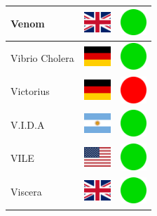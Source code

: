 \documentclass[12pt, a4paper, twoside]{report}
\begin{document}
\begin{center}
\begin{longtable}{|p{5cm}|p{2cm}|p{2cm}|}
 Venom                                                      & \includegraphics[width=1cm]{4x3/gb} &   \includegraphics[width=1cm]{likes/y} \\ \hline
 Vibrio Cholera                                             & \includegraphics[width=1cm]{4x3/de} &   \includegraphics[width=1cm]{likes/y} \\ \hline
 Victorius                                                  & \includegraphics[width=1cm]{4x3/de} &   \includegraphics[width=1cm]{likes/n} \\ \hline
 V.I.D.A                                                    & \includegraphics[width=1cm]{4x3/ar} &   \includegraphics[width=1cm]{likes/y} \\ \hline
 VILE                                                       & \includegraphics[width=1cm]{4x3/us} &   \includegraphics[width=1cm]{likes/y} \\ \hline
 Viscera                                                    & \includegraphics[width=1cm]{4x3/gb} &   \includegraphics[width=1cm]{likes/y} \\ \hline

\end{longtable}
\end{center}
\end{document}
